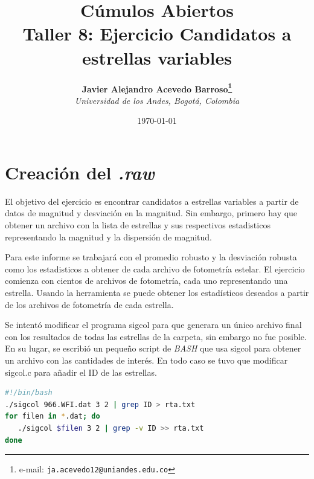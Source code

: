 \documentclass[12pt]{article}
\begin{document}
\title{Cúmulos Abiertos \\ Taller 8: Ejercicio Candidatos a estrellas variables}

\author{
\textbf{Javier Alejandro Acevedo Barroso\thanks{e-mail: \texttt{ja.acevedo12@uniandes.edu.co}}}\\
\textit{Universidad de los Andes, Bogotá, Colombia}\\
 }%

\date{\today}
\maketitle %


\normalsize
\newpage




\section{Creación del \emph{.raw}}
El objetivo del ejercicio es encontrar candidatos a estrellas variables a partir de datos de magnitud y desviación en la magnitud. Sin embargo, primero hay que obtener un archivo con la lista de estrellas y sus respectivos estadisticos representando la magnitud y la dispersión de magnitud.

Para este informe se trabajará con el promedio robusto y la desviación robusta como los estadisticos a obtener de cada archivo de fotometría estelar. El ejercicio comienza con cientos de archivos de fotometría, cada uno representando una estrella. Usando la herramienta  se puede obtener los estadísticos deseados a partir de los archivos de fotometría de cada estrella.

Se intentó modificar el programa sigcol para que generara un único archivo final con los resultados de todas las estrellas de la carpeta, sin embargo no fue posible. En su lugar, se escribió un pequeño script de \emph{BASH} que usa sigcol para obtener un archivo  con las cantidades de interés. En todo caso se tuvo que modificar sigcol.c para añadir el ID de las estrellas.

\begin{lstlisting}[language=bash]
#!/bin/bash
./sigcol 966.WFI.dat 3 2 | grep ID > rta.txt
for filen in *.dat; do
   ./sigcol $filen 3 2 | grep -v ID >> rta.txt
done
\end{lstlisting}
\end{document}
